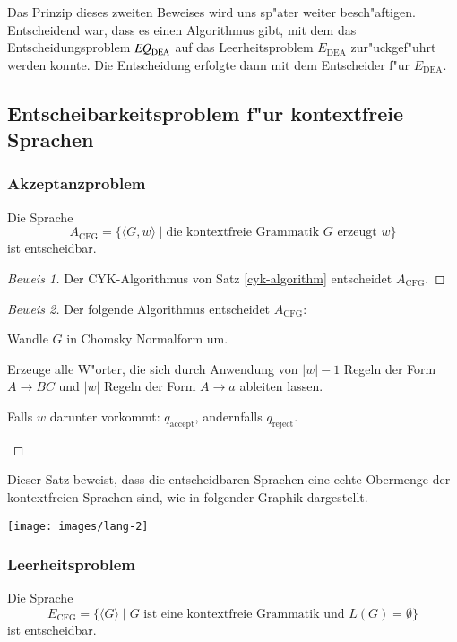Das Prinzip dieses zweiten Beweises wird uns sp"ater weiter besch"aftigen.
Entscheidend war, dass es einen Algorithmus gibt, mit dem das
Entscheidungsproblem 
$\text{\it EQ}_{\text{DEA}}$
auf das Leerheitsproblem
$E_{\text{DEA}}$ zur"uckgef"uhrt werden konnte. Die Entscheidung
erfolgte dann mit dem Entscheider f"ur
$E_{\text{DEA}}$.

\subsection{Entscheibarkeitsproblem f"ur kontextfreie Sprachen}
\subsubsection{Akzeptanzproblem}
\begin{satz}
Die Sprache
\[
A_{\text{CFG}}=\{
\langle G,w\rangle\;|\; \text{die kontextfreie Grammatik $G$ erzeugt $w$}
\}
\]
ist entscheidbar.
\end{satz}

\begin{proof}[Beweis 1]
Der CYK-Algorithmus von Satz \ref{cyk-algorithm} entscheidet
$A_{\text{CFG}}$.
\end{proof}

\begin{proof}[Beweis 2]
Der folgende Algorithmus entscheidet
$A_{\text{CFG}}$:
\medskip
\begin{compactenum}
\item Wandle $G$ in Chomsky Normalform um.
\item Erzeuge alle W"orter, die sich durch Anwendung
von $|w|-1$ Regeln der Form $A\to BC$ und $|w|$ Regeln
der Form $A\to a$ ableiten lassen. 
\item Falls $w$ darunter vorkommt: $q_{\text{accept}}$, 
andernfalls $q_{\text{reject}}$.
\end{compactenum}
\medskip
\end{proof}
Dieser Satz beweist, dass die entscheidbaren Sprachen eine echte
Obermenge der kontextfreien Sprachen sind, wie in folgender
Graphik dargestellt.
\begin{center}
\texttt{[image: images/lang-2]}
\end{center}

\subsubsection{Leerheitsproblem}
\begin{satz}
Die Sprache
\[
E_{\text{CFG}}=\{
\langle G\rangle\;|\; \text{$G$ ist eine kontextfreie Grammatik und $L(G)=\emptyset$}
\}
\]
ist entscheidbar.
\end{satz}

